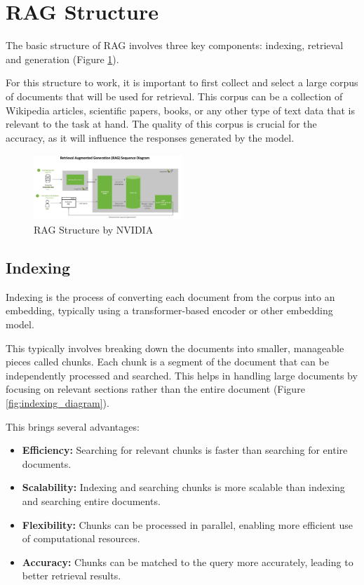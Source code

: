 \documentclass[conference]{IEEEtran}
\begin{document}
\section{RAG Structure}
The basic structure of RAG involves three key components: indexing, retrieval and generation (Figure \ref{fig:rag_structure}).

For this structure to work, it is important to first collect and select a large
corpus of documents that will be used for retrieval. This corpus can be a collection of
Wikipedia articles, scientific papers, books, or any other type of text data that is relevant to the task at hand.
The quality of this corpus is crucial for the accuracy, as it will influence the responses generated by the model.

\begin{figure}[htbp!]
    \centerline{\includegraphics[width=0.5\textwidth]{images/NVIDIA-RAG-diagram-scaled.jpg}}
    \caption{RAG Structure by NVIDIA \cite{merritt_what_2024}}
    \label{fig:rag_structure}
\end{figure}

\subsection{Indexing}
Indexing is the process of converting each document from the corpus into an embedding,
typically using a transformer-based encoder or other embedding model.

This typically involves breaking down the documents into smaller, manageable
pieces called chunks. Each chunk is a segment of the document that can be independently processed and searched.
This helps in handling large documents by focusing on relevant sections rather than the entire document (Figure \ref{fig:indexing_diagram}).

This brings several advantages:
\begin{itemize}
    \item \textbf{Efficiency:} Searching for relevant chunks is faster than searching for entire documents.
    \item \textbf{Scalability:} Indexing and searching chunks is more scalable than indexing and searching entire documents.
    \item \textbf{Flexibility:} Chunks can be processed in parallel, enabling more efficient use of computational resources.
    \item \textbf{Accuracy:} Chunks can be matched to the query more accurately, leading to better retrieval results.
\end{itemize}
\end{document}
